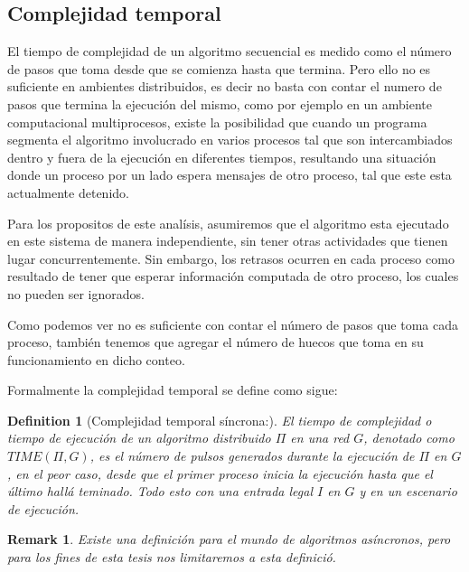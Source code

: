 \documentclass[10pt]{report}
\newtheorem*{remark}{Remark}
\newtheorem{definition}{Definition}
\begin{document}
    \subsection{Complejidad temporal}\label{subsec:complejidad-temporal}
    El tiempo de complejidad de un algoritmo secuencial es medido como el número de pasos que toma desde que se comienza
    hasta que termina.
    Pero ello no es suficiente en ambientes distribuidos, es decir no basta con contar el numero de pasos que termina la
    ejecución del mismo, como por ejemplo en un ambiente computacional multiprocesos, existe la posibilidad que cuando un
    programa segmenta el algoritmo involucrado en varios procesos tal que son intercambiados dentro y fuera de la ejecución
    en diferentes tiempos, resultando una situación donde un proceso por un lado espera mensajes de otro proceso, tal que
    este esta actualmente detenido.\newline

    Para los propositos de este analísis, asumiremos que el algoritmo esta ejecutado en este sistema de manera independiente,
    sin tener otras actividades que tienen lugar concurrentemente.
    Sin embargo, los retrasos ocurren en cada proceso como resultado de tener que esperar información computada de otro
    proceso, los cuales no pueden ser ignorados.\newline

    Como podemos ver no es suficiente con contar el número de pasos que toma cada proceso, también tenemos que agregar
    el número de huecos que toma en su funcionamiento en dicho conteo.
    \newpage

    Formalmente la complejidad temporal se define como sigue:
    \begin{definition}
        [Complejidad temporal síncrona:] El tiempo de complejidad o tiempo de ejecución de un
        algoritmo distribuido $\Pi$ en una red $G$, denotado como $TIME(\Pi,G)$, es el número de pulsos generados
        durante la ejecución de $\Pi$ en $G$, en el peor caso, desde que el primer proceso inicia la ejecución
        hasta que el último hallá teminado.
        Todo esto con una entrada legal $I$ en $G$ y en un escenario de ejecución.
    \end{definition}
    \begin{remark}
        Existe una definición para el mundo de algoritmos asíncronos, pero para los fines
    de esta tesis nos limitaremos a esta definició.
    \end{remark}
\end{document}
